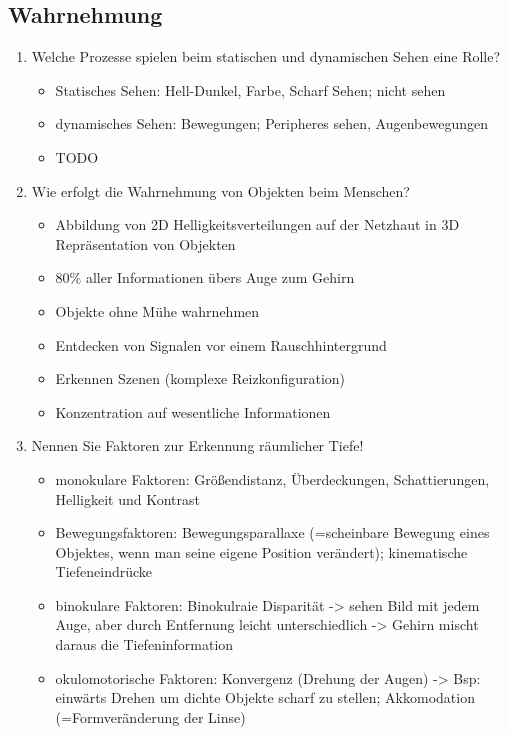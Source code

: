 \subsection{Wahrnehmung}
\begin{enumerate}
	\item Welche Prozesse spielen beim statischen und dynamischen Sehen eine
	Rolle?
	\begin{itemize}
		\item Statisches Sehen: Hell-Dunkel, Farbe, Scharf Sehen; nicht sehen
		\item dynamisches Sehen: Bewegungen; Peripheres sehen, Augenbewegungen
		\item TODO
	\end{itemize}
	
	\item Wie erfolgt die Wahrnehmung von Objekten beim Menschen?
	\begin{itemize}
		\item Abbildung von 2D Helligkeitsverteilungen auf der Netzhaut in 3D Repräsentation von Objekten
		\item 80\% aller Informationen übers Auge zum Gehirn
		\item Objekte ohne Mühe wahrnehmen
		\item Entdecken von Signalen vor einem Rauschhintergrund
		\item Erkennen Szenen (komplexe Reizkonfiguration)
		\item Konzentration auf wesentliche Informationen
	\end{itemize}
	\item Nennen Sie Faktoren zur Erkennung räumlicher Tiefe!
	\begin{itemize}
		\item monokulare Faktoren: Größendistanz, Überdeckungen, Schattierungen, Helligkeit und Kontrast
		\item Bewegungsfaktoren: Bewegungsparallaxe (=scheinbare Bewegung eines Objektes, wenn man seine eigene Position verändert); kinematische Tiefeneindrücke
		\item binokulare Faktoren: Binokulraie Disparität -> sehen Bild mit jedem Auge, aber durch Entfernung leicht unterschiedlich -> Gehirn mischt daraus die Tiefeninformation
		\item okulomotorische Faktoren: Konvergenz (Drehung der Augen) -> Bsp: einwärts Drehen um dichte Objekte scharf zu stellen; Akkomodation (=Formveränderung der Linse)
	\end{itemize}
	

\end{enumerate}
